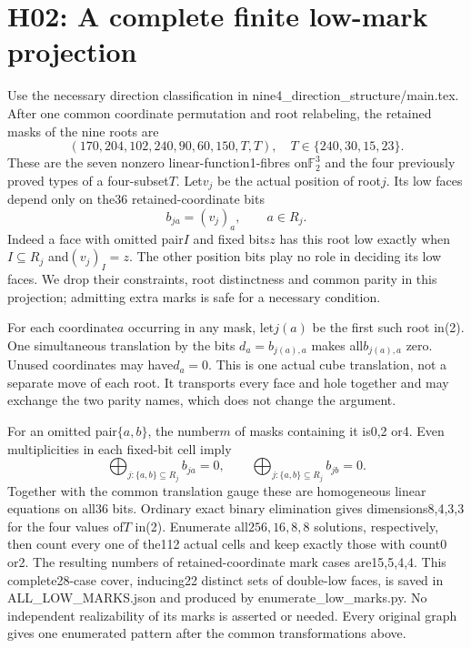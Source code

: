 \documentclass{article}
\begin{document}
\section{H02: A complete finite low-mark projection}
Use the necessary direction classification in
nine4\_direction\_structure/main.tex. After one common coordinate
permutation and root relabeling, the retained masks of the nine roots are
\[
       (170,204,102,240,90,60,150,T,T),\quad
                    T\in\{240,30,15,23\}.                  \tag{2}
\]
These are the seven nonzero linear-function1-fibres on$\mathbb F_2^3$
and the four previously proved types of a four-subset$T$.
Let$v_j$ be the actual position of root$j$. Its low faces depend only
on the36 retained-coordinate bits
\[
                   b_{ja}=(v_j)_a,\qquad a\in R_j.         \tag{3}
\]
Indeed a face with omitted pair$I$ and fixed bits$z$ has this root low
exactly when$I\subseteq R_j$ and$(v_j)_I=z$. The other position bits
play no role in deciding its low faces. We drop their constraints,
root distinctness and common parity in this projection; admitting extra
marks is safe for a necessary condition.

For each coordinate$a$ occurring in any mask, let$j(a)$ be the first
such root in(2). One simultaneous translation by the bits
$d_a=b_{j(a),a}$ makes all$b_{j(a),a}$ zero. Unused coordinates may
have$d_a=0$. This is one actual cube translation, not a separate move
of each root. It transports every face and hole together and may
exchange the two parity names, which does not change the argument.

For an omitted pair$\{a,b\}$, the number$m$ of masks containing it
is0,2 or4. Even multiplicities in each fixed-bit cell imply
\[
       \bigoplus_{j:\{a,b\}\subseteq R_j} b_{ja}=0,
       \qquad
       \bigoplus_{j:\{a,b\}\subseteq R_j} b_{jb}=0.        \tag{4}
\]
Together with the common translation gauge these are homogeneous
linear equations on all36 bits. Ordinary exact binary elimination
gives dimensions8,4,3,3 for the four values of$T$ in(2).
Enumerate all$256,16,8,8$ solutions, respectively, then count every
one of the112 actual cells and keep exactly those with count0 or2.
The resulting numbers of retained-coordinate mark cases are15,5,4,4.
This complete28-case cover, inducing22 distinct sets of double-low faces,
is saved in ALL\_LOW\_MARKS.json and produced
by enumerate\_low\_marks.py. No independent realizability of its marks
is asserted or needed. Every original graph gives one enumerated
pattern after the common transformations above.
\end{document}
